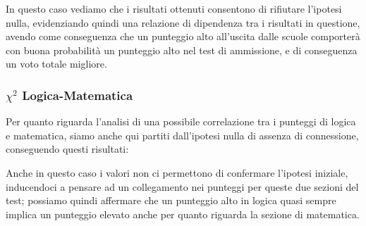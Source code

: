 In questo caso vediamo che i risultati ottenuti consentono di rifiutare l’ipotesi nulla, evidenziando quindi una relazione di dipendenza tra i risultati in questione, avendo come conseguenza che un punteggio alto all’uscita dalle scuole comporterà con buona probabilità un punteggio alto nel test di ammissione, e di conseguenza un voto totale migliore.

\subsubsection{$\chi^2$ Logica-Matematica}

\begin{center}
\end{center}

Per quanto riguarda l’analisi di una possibile correlazione tra i punteggi di logica e matematica, siamo anche qui partiti dall’ipotesi nulla di assenza di connessione, conseguendo questi risultati:

\begin{center}
\end{center}

Anche in questo caso i valori non ci permettono di confermare l’ipotesi iniziale, inducendoci a pensare ad un collegamento nei punteggi per queste due sezioni del test; possiamo quindi affermare che un punteggio alto in logica quasi sempre implica un punteggio elevato anche per quanto riguarda la sezione di matematica.
